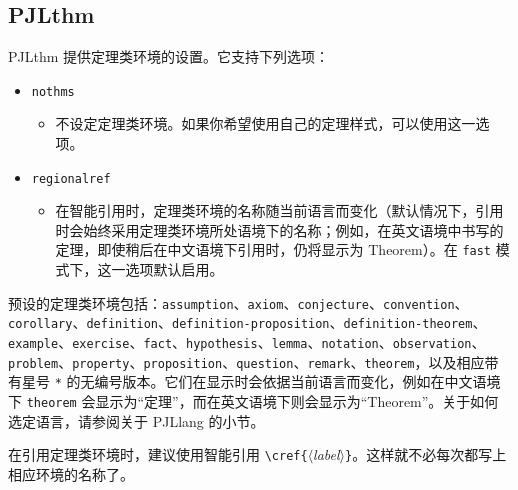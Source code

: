 \documentclass[Chinese,English,French,allowbf,puretext]{lebhart}
\providecommand{\meta}[1]{$\langle${\normalfont\itshape#1}$\rangle$}
\newenvironment{tip}[1][提示]{%
    \begin{tcolorbox}[breakable,
        enhanced,
        width = \textwidth,
        colback = paper, colbacktitle = paper,
        colframe = gray!50, boxrule=0.2mm,
        coltitle = black,
        fonttitle = \sffamily,
        attach boxed title to top left = {yshift=-\tcboxedtitleheight/2, xshift=.5cm},
        boxed title style = {boxrule=0pt, colframe=paper},
        before skip = 0.3cm,
        after skip = 0.3cm,
        top = 3mm,
        bottom = 3mm,
        title={\scshape\sffamily #1}]%
}{\end{tcolorbox}}
\providecommand{\PJLlang}{\textsf{PJLlang}}
\providecommand{\PJLthm}{\textsf{PJLthm}}
\begin{document}
\subsection{PJLthm}

\PJLthm{} 提供定理类环境的设置。它支持下列选项：
\begin{itemize}
    \item \texttt{nothms}
    \begin{itemize}
        \item 不设定定理类环境。如果你希望使用自己的定理样式，可以使用这一选项。
    \end{itemize}
    \item \texttt{regionalref}
    \begin{itemize}
        \item 在智能引用时，定理类环境的名称随当前语言而变化（默认情况下，引用时会始终采用定理类环境所处语境下的名称；例如，在英文语境中书写的定理，即使稍后在中文语境下引用时，仍将显示为 Theorem）。在 \texttt{fast} 模式下，这一选项默认启用。
    \end{itemize}
\end{itemize}

预设的定理类环境包括：\texttt{assumption}、\texttt{axiom}、\texttt{conjecture}、\texttt{convention}、\texttt{corollary}、\texttt{definition}、\texttt{definition-proposition}、\texttt{definition-theorem}、\texttt{example}、\texttt{exercise}、\texttt{fact}、\texttt{hypothesis}、\texttt{lemma}、\texttt{notation}、\texttt{observation}、\texttt{problem}、\texttt{property}、\texttt{proposition}、\texttt{question}、\texttt{remark}、\texttt{theorem}，以及相应带有星号 \lstinline|*| 的无编号版本。它们在显示时会依据当前语言而变化，例如在中文语境下 \texttt{theorem} 会显示为“定理”，而在英文语境下则会显示为“Theorem”。关于如何选定语言，请参阅关于 \PJLlang{} 的小节。

\begin{tip}
    在引用定理类环境时，建议使用智能引用 \lstinline|\cref{|\meta{label}\lstinline|}|。这样就不必每次都写上相应环境的名称了。
\end{tip}

\medskip
\end{document}
